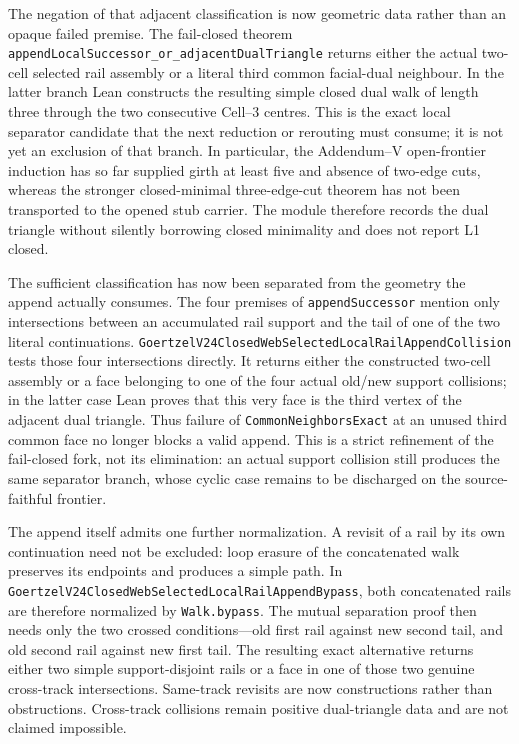 \documentclass[11pt]{article}
\theoremstyle{definition}
\begin{document}
The negation of that adjacent classification is now geometric data rather
than an opaque failed premise.  The fail-closed theorem
\texttt{appendLocalSuccessor\_or\_adjacentDualTriangle} returns either the
actual two-cell selected rail assembly or a literal third common facial-dual
neighbour.  In the latter branch Lean constructs the resulting simple closed
dual walk of length three through the two consecutive Cell--3 centres.  This
is the exact local separator candidate that the next reduction or rerouting
must consume; it is not yet an exclusion of that branch.  In particular, the
Addendum--V open-frontier induction has so far supplied girth at least five
and absence of two-edge cuts, whereas the stronger closed-minimal
three-edge-cut theorem has not been transported to the opened stub carrier.
The module therefore records the dual triangle without silently borrowing
closed minimality and does not report L1 closed.

The sufficient classification has now been separated from the geometry the
append actually consumes.  The four premises of
\texttt{appendSuccessor} mention only intersections between an accumulated
rail support and the tail of one of the two literal continuations.
\texttt{GoertzelV24ClosedWebSelectedLocalRailAppendCollision} tests those four
intersections directly.  It returns either the constructed two-cell assembly
or a face belonging to one of the four actual old/new support collisions; in
the latter case Lean proves that this very face is the third vertex of the
adjacent dual triangle.  Thus failure of \texttt{CommonNeighborsExact} at an
unused third common face no longer blocks a valid append.  This is a strict
refinement of the fail-closed fork, not its elimination: an actual support
collision still produces the same separator branch, whose cyclic case remains
to be discharged on the source-faithful frontier.

The append itself admits one further normalization.  A revisit of a rail by
its own continuation need not be excluded: loop erasure of the concatenated
walk preserves its endpoints and produces a simple path.  In
\texttt{GoertzelV24ClosedWebSelectedLocalRailAppendBypass}, both concatenated
rails are therefore normalized by \texttt{Walk.bypass}.  The mutual
separation proof then needs only the two crossed conditions---old first rail
against new second tail, and old second rail against new first tail.  The
resulting exact alternative returns either two simple support-disjoint rails
or a face in one of those two genuine cross-track intersections.  Same-track
revisits are now constructions rather than obstructions.  Cross-track
collisions remain positive dual-triangle data and are not claimed impossible.
\end{document}
